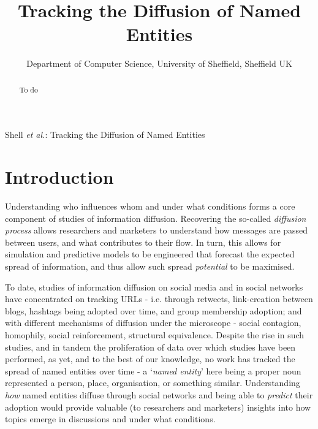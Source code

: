 \documentclass[journal,10pt,draftclsnofoot,onecolumn]{IEEEtran}
\begin{document}
\title{Tracking the Diffusion of Named Entities}


\author{
Department of Computer Science, University of Sheffield, Sheffield UK}


{Shell \MakeLowercase{\textit{et al.}}: Tracking the Diffusion of Named Entities}

\maketitle

\begin{abstract}
To do
\end{abstract}


\IEEEpeerreviewmaketitle


\section{Introduction}
Understanding who influences whom and under what conditions forms a core component of studies of information diffusion.
Recovering the so-called \emph{diffusion process} allows researchers and marketers to understand how messages are passed between users, and what contributes to their flow.
In turn, this allows for simulation and predictive models to be engineered that forecast the expected spread of information, and thus allow such spread \emph{potential} to be maximised.

To date, studies of information diffusion on social media and in social networks have concentrated on tracking URLs - i.e. through retweets, link-creation between blogs, hashtags being adopted over time, and group membership adoption; and with different mechanisms of diffusion under the microscope - social contagion, homophily, social reinforcement, structural equivalence.
Despite the rise in such studies, and in tandem the proliferation of data over which studies have been performed, as yet, and to the best of our knowledge, no work has tracked the spread of named entities over time - a `\emph{named entity}' here being a proper noun represented a person, place, organisation, or something similar.
Understanding \emph{how} named entities diffuse through social networks and being able to \emph{predict} their adoption would provide valuable (to researchers and marketers) insights into how topics emerge in discussions and under what conditions.
\end{document}
